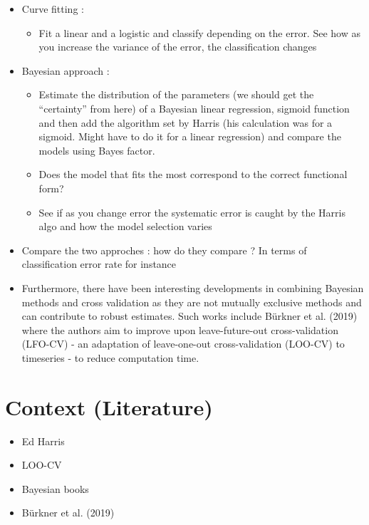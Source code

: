 \documentclass[]{article}
\providecommand{\tightlist}{%
  \setlength{\itemsep}{0pt}\setlength{\parskip}{0pt}}
\begin{document}
\begin{itemize}
\item
  Curve fitting :

  \begin{itemize}
  \tightlist
  \item
    Fit a linear and a logistic and classify depending on the error. See
    how as you increase the variance of the error, the classification
    changes
  \end{itemize}
\item
  Bayesian approach :

  \begin{itemize}
  \item
    Estimate the distribution of the parameters (we should get the
    ``certainty'' from here) of a Bayesian linear regression, sigmoid
    function and then add the algorithm set by Harris (his calculation
    was for a sigmoid. Might have to do it for a linear regression) and
    compare the models using Bayes factor.
  \item
    Does the model that fits the most correspond to the correct
    functional form?
  \item
    See if as you change error the systematic error is caught by the
    Harris algo and how the model selection varies
  \end{itemize}
\item
  Compare the two approches : how do they compare ? In terms of
  classification error rate for instance
\item
  Furthermore, there have been interesting developments in combining
  Bayesian methods and cross validation as they are not mutually
  exclusive methods and can contribute to robust estimates. Such works
  include Bürkner et al. (2019) where the authors aim to improve upon
  leave-future-out cross-validation (LFO-CV) - an adaptation of
  leave-one-out cross-validation (LOO-CV) to timeseries - to reduce
  computation time.
\end{itemize}

\hypertarget{context-literature}{%
\section{Context (Literature)}\label{context-literature}}

\begin{itemize}
\tightlist
\item
  Ed Harris
\item
  LOO-CV
\item
  Bayesian books
\item
  Bürkner et al. (2019)
\end{itemize}
\end{document}
